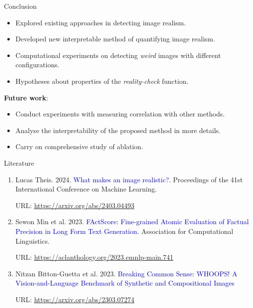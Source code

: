 \documentclass{beamer}
\begin{document}
\begin{frame}{Conclusion}
  \begin{itemize}
    \item Explored existing approaches in detecting image realism.
      \item Developed new interpretable method of quantifying image realism.
      \item Computational experiments on detecting \textit{weird} images with different configurations.
      \item Hypotheses about properties of the \textit{reality-check} function.
      
  \end{itemize}

  \textbf{Future work}: 
  \begin{itemize}
      \item Conduct experiments with measuring correlation with other methods.
      \item Analyse the interpretability of the proposed method in more details.
      \item Carry on comprehensive study of ablation.
  \end{itemize}
\end{frame}

\begin{frame}{Literature}
\begin{enumerate}
    \item Lucas Theis. 2024. \textcolor{blue}{What makes an image realistic?}. Proceedings of the 41st International Conference on Machine Learning.

    URL: \url{https://arxiv.org/abs/2403.04493}

    \item Sewon Min et al. 2023. \textcolor{blue}{{FA}ct{S}core: Fine-grained Atomic Evaluation of Factual Precision in Long Form Text Generation}. Association for Computational Linguistics.

    URL: \url{https://aclanthology.org/2023.emnlp-main.741}

    \item Nitzan Bitton-Guetta et al. 2023. \textcolor{blue}{Breaking Common Sense: WHOOPS! A Vision-and-Language Benchmark of Synthetic and Compositional Images}

    URL: \url{https://arxiv.org/abs/2303.07274}

  \end{enumerate}
\end{frame}
\end{document}
